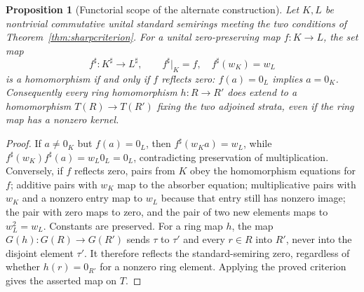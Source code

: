 \documentclass[11pt]{article}
\newtheorem{proposition}[theorem]{Proposition}
\theoremstyle{definition}
\begin{document}
\begin{proposition}[Functorial scope of the alternate construction]
Let \(K,L\) be nontrivial commutative unital standard semirings meeting
the two conditions of Theorem~\ref{thm:sharpcriterion}. For a unital
zero-preserving map \(f:K\to L\), the set map
\[
 f^\sharp:K^\sharp\to L^\sharp,\qquad
 f^\sharp|_K=f,\quad f^\sharp(w_K)=w_L
\]
is a homomorphism if and only if \(f\) reflects zero:
\(f(a)=0_L\) implies \(a=0_K\).
Consequently every ring homomorphism \(h:R\to R'\) does extend to
a homomorphism \(T(R)\to T(R')\) fixing the two adjoined strata,
even if the ring map has a nonzero kernel.
\end{proposition}
\begin{proof}
If \(a\ne0_K\) but \(f(a)=0_L\), then
\(f^\sharp(w_Ka)=w_L\), while
\(f^\sharp(w_K)f^\sharp(a)=w_L0_L=0_L\), contradicting preservation
of multiplication. Conversely, if \(f\) reflects zero, pairs from
\(K\) obey the homomorphism equations for \(f\); additive pairs
with \(w_K\) map to the absorber equation; multiplicative pairs with
\(w_K\) and a nonzero entry map to \(w_L\) because that entry still
has nonzero image; the pair with zero maps to zero, and the pair of
two new elements maps to \(w_L^2=w_L\). Constants are preserved.
For a ring map \(h\), the map \(G(h):G(R)\to G(R')\) sends
\(\tau\) to \(\tau'\) and every \(r\in R\) into \(R'\), never
into the disjoint element \(\tau'\). It therefore reflects the
standard-semiring zero, regardless of whether \(h(r)=0_{R'}\)
for a nonzero ring element. Applying the proved criterion gives the
asserted map on \(T\).
\end{proof}
\end{document}
